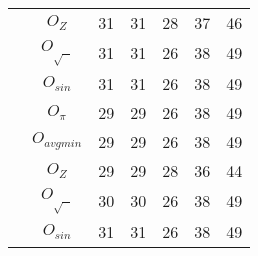 \begin{tabular}{| c | c | c | c | c | c | c |}
&$O_{Z}$ &31 &31 &28 &37 &46 \\ \cline{2-7}
&$O_{\sqrt{\text{ }}}$ &31 &31 &26 &38 &49 \\ \cline{2-7}
&$O_{sin}$ &31 &31 &26 &38 &49 \\ \hhline{|=|=|=|=|=|=|=|}
\multirow{5}{*}{$T_{einstein}$}&$O_{\pi}$ &29 &29 &26 &38 &49 \\ \cline{2-7}
&$O_{avgmin}$ &29 &29 &26 &38 &49 \\ \cline{2-7}
&$O_{Z}$ &29 &29 &28 &36 &44 \\ \cline{2-7}
&$O_{\sqrt{\text{ }}}$ &30 &30 &26 &38 &49 \\ \cline{2-7}
&$O_{sin}$ &31 &31 &26 &38 &49 \\ \hline
\end{tabular}
